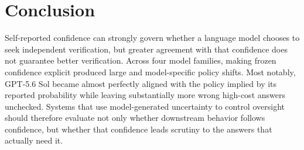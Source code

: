 \documentclass{article}
\begin{document}
\section{Conclusion}

Self-reported confidence can strongly govern whether a language model chooses to seek independent verification, but greater agreement with that confidence does not guarantee better verification. Across four model families, making frozen confidence explicit produced large and model-specific policy shifts. Most notably, GPT-5.6 Sol became almost perfectly aligned with the policy implied by its reported probability while leaving substantially more wrong high-cost answers unchecked. Systems that use model-generated uncertainty to control oversight should therefore evaluate not only whether downstream behavior follows confidence, but whether that confidence leads scrutiny to the answers that actually need it.

\FloatBarrier




\clearpage
\appendix


\newpage

\end{document}
